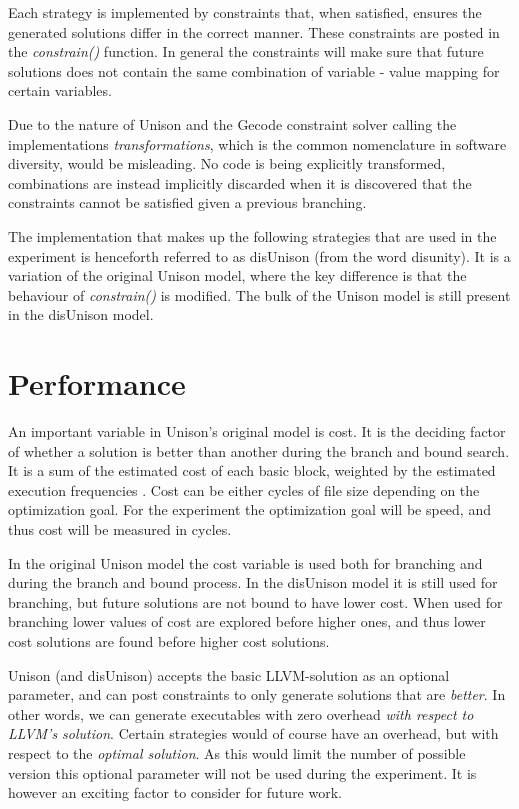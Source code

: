 Each strategy is implemented by constraints that, when satisfied, ensures the
generated solutions differ in the correct manner. These constraints are posted in the
\textit{constrain()} function. In general the constraints will make sure that future
solutions does not contain the same combination of variable - value mapping for certain
variables.

Due to the nature of Unison and the Gecode constraint solver calling the implementations
\textit{transformations}, which is the common nomenclature in software diversity, would be
misleading. No code is being explicitly transformed, combinations are instead implicitly
discarded when it is discovered that the constraints cannot be satisfied given a previous
branching.

The implementation that makes up the following strategies that are used in the experiment
is henceforth referred to as disUnison (from the word disunity). It is a variation of the
original Unison model, where the key difference is that the behaviour of \textit{constrain()}
is modified. The bulk of the Unison model is still present in the disUnison model.




\section{Performance}
\label{sec:performance}

An important variable in Unison's original model is cost. It is the deciding factor of
whether a solution is better than another during the branch and bound search. It is a sum
of the estimated cost of each basic block, weighted by the estimated execution frequencies
\cite{unison-docs}. Cost can be either cycles of file size depending on the optimization
goal. For the experiment the optimization goal will be speed, and thus cost will be
measured in cycles.

In the original Unison model the cost variable is used both for branching and during the
branch and bound process. In the disUnison model it is still used for branching, but future
solutions are not bound to have lower cost. When used for branching lower values of cost
are explored before higher ones, and thus lower cost solutions are found before higher
cost solutions.

Unison (and disUnison) accepts the basic LLVM-solution as an optional parameter, and can
post constraints to only generate solutions that are \textit{better}. In other words, we
can generate executables with zero overhead \textit{with respect to LLVM's solution}.
Certain strategies would of course have an overhead, but with respect to the
\textit{optimal solution}. As this would limit the number of possible version this
optional parameter will not be used during the experiment. It is however an exciting
factor to consider for future work.

